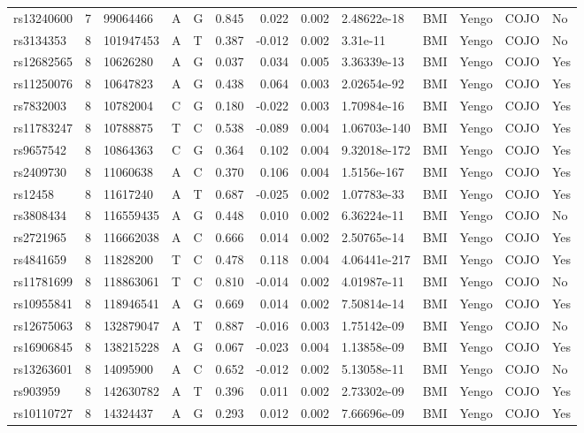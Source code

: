 \documentclass[11pt,twoside]{bristolthesis}
\begin{document}
\begin{longtable}[t]{lrlllrrrlllll}
rs13240600 & 7 & 99064466 & A & G & 0.845 & 0.022 & 0.002 & 2.48622e-18 & BMI & Yengo & COJO & No\\
rs3134353 & 8 & 101947453 & A & T & 0.387 & -0.012 & 0.002 & 3.31e-11 & BMI & Yengo & COJO & No\\
\addlinespace
rs12682565 & 8 & 10626280 & A & G & 0.037 & 0.034 & 0.005 & 3.36339e-13 & BMI & Yengo & COJO & Yes\\
rs11250076 & 8 & 10647823 & A & G & 0.438 & 0.064 & 0.003 & 2.02654e-92 & BMI & Yengo & COJO & Yes\\
rs7832003 & 8 & 10782004 & C & G & 0.180 & -0.022 & 0.003 & 1.70984e-16 & BMI & Yengo & COJO & Yes\\
rs11783247 & 8 & 10788875 & T & C & 0.538 & -0.089 & 0.004 & 1.06703e-140 & BMI & Yengo & COJO & Yes\\
rs9657542 & 8 & 10864363 & C & G & 0.364 & 0.102 & 0.004 & 9.32018e-172 & BMI & Yengo & COJO & Yes\\
\addlinespace
rs2409730 & 8 & 11060638 & A & C & 0.370 & 0.106 & 0.004 & 1.5156e-167 & BMI & Yengo & COJO & Yes\\
rs12458 & 8 & 11617240 & A & T & 0.687 & -0.025 & 0.002 & 1.07783e-33 & BMI & Yengo & COJO & Yes\\
rs3808434 & 8 & 116559435 & A & G & 0.448 & 0.010 & 0.002 & 6.36224e-11 & BMI & Yengo & COJO & No\\
rs2721965 & 8 & 116662038 & A & C & 0.666 & 0.014 & 0.002 & 2.50765e-14 & BMI & Yengo & COJO & Yes\\
rs4841659 & 8 & 11828200 & T & C & 0.478 & 0.118 & 0.004 & 4.06441e-217 & BMI & Yengo & COJO & Yes\\
\addlinespace
rs11781699 & 8 & 118863061 & T & C & 0.810 & -0.014 & 0.002 & 4.01987e-11 & BMI & Yengo & COJO & No\\
rs10955841 & 8 & 118946541 & A & G & 0.669 & 0.014 & 0.002 & 7.50814e-14 & BMI & Yengo & COJO & Yes\\
rs12675063 & 8 & 132879047 & A & T & 0.887 & -0.016 & 0.003 & 1.75142e-09 & BMI & Yengo & COJO & No\\
rs16906845 & 8 & 138215228 & A & G & 0.067 & -0.023 & 0.004 & 1.13858e-09 & BMI & Yengo & COJO & Yes\\
rs13263601 & 8 & 14095900 & A & C & 0.652 & -0.012 & 0.002 & 5.13058e-11 & BMI & Yengo & COJO & No\\
\addlinespace
rs903959 & 8 & 142630782 & A & T & 0.396 & 0.011 & 0.002 & 2.73302e-09 & BMI & Yengo & COJO & Yes\\
rs10110727 & 8 & 14324437 & A & G & 0.293 & 0.012 & 0.002 & 7.66696e-09 & BMI & Yengo & COJO & Yes\\

\end{longtable}
\end{document}
